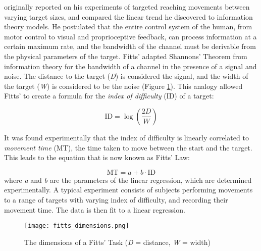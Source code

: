 \citet{fitts_information_1954} originally reported on his experiments of targeted reaching movements between varying target sizes, and compared the linear trend he discovered to information theory models.
He postulated that the entire control system of the human, from motor control to visual and proprioceptive feedback, can process information at a certain maximum rate, and the bandwidth of the channel must be derivable from the physical parameters of the target.
Fitts' adapted Shannons' Theorem \citep{shannon_communication_1949} from information theory for the bandwidth of a channel in the presence of a signal and noise.
The distance to the target (\emph{D}) is considered the signal, and the width of the target (\emph{W}) is considered to be the noise (Figure \ref{fig:intro_fitts}).
This analogy allowed Fitts' to create a formula for the \emph{index of difficulty} (\(\text{ID}\)) of a target:

\begin{equation}
    \mathrm{ID} = \log\left(\frac{2D}{W}\right)
    \label{eq:intro_id}
\end{equation}

It was found experimentally that the index of difficulty is linearly correlated to \emph{movement time} (MT), the time taken to move between the start and the target.
This leads to the equation that is now known as Fitts' Law:

\begin{equation}
    \mathrm{MT} = a + b \cdot \mathrm{ID}
\end{equation}
where \emph{a} and \emph{b} are the parameters of the linear regression, which are determined experimentally.
A typical experiment consists of subjects performing movements to a range of targets with varying index of difficulty, and recording their movement time.
The data is then fit to a linear regression.

\begin{figure}
    \centering
    \texttt{[image: fitts\_dimensions.png]}
    \caption{The dimensions of a Fitts' Task (\emph{D} = distance, \emph{W} = width)}
    \label{fig:intro_fitts}
\end{figure}

